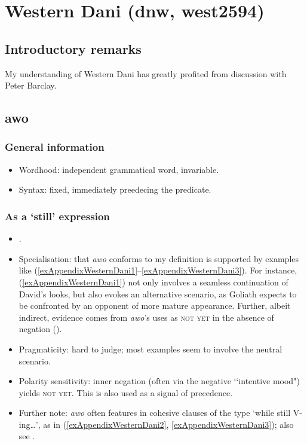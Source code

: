 \section{Western Dani (dnw, west2594)}
\label{appendixWesternDani}
\subsection{Introductory remarks}
My understanding of Western Dani has greatly profited from discussion with Peter Barclay.

\subsection{awo}
\subsubsection{General information}
\begin{itemize}
	\item Wordhood: independent grammatical word, invariable.
	\item Syntax: fixed, immediately preedecing the predicate.
\end{itemize}

\subsubsection{As a \lq{}still\rq{ }expression}
\begin{itemize}
	\item \textcite[304, 440–441]{Barclay2008}.
	\item Specialisation: that \textit{awo} conforms to my definition is supported by examples like (\ref{exAppendixWesternDani1}–\ref{exAppendixWesternDani3}). For instance, (\ref{exAppendixWesternDani1}) not only involves a seamless continuation of David's looks, but also evokes an alternative scenario, as Goliath expects to be confronted by an opponent of more mature appearance. Further, albeit indirect, evidence comes from \textit{awo}'s uses as \textsc{not yet} in the absence of negation ().
	\item Pragmaticity: hard to judge; most examples seem to involve the neutral scenario.
	\item Polarity sensitivity: inner negation (often via the negative \lq\lq intentive mood") yields \textsc{not yet}. This is also used as a signal of precedence.
	\item Further note: \textit{awo} often features in cohesive clauses of the type \lq while still V-ing…', as in (\ref{exAppendixWesternDani2}, \ref{exAppendixWesternDani3});  also see \textcite[575, 619]{Barclay2008}.
\end{itemize}
\largerpage[2]

